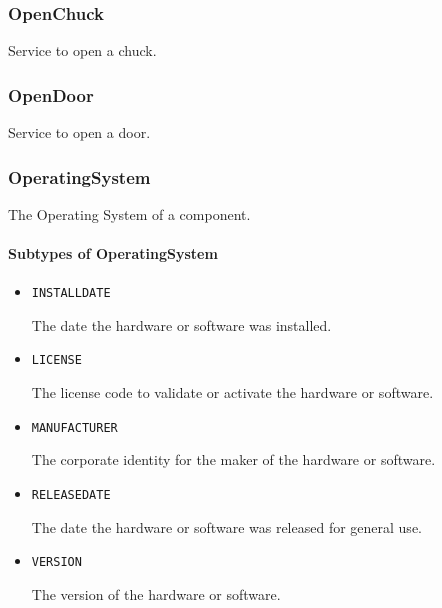 \subsubsection{OpenChuck}
\label{sec:OpenChuck}



Service to open a chuck.


\subsubsection{OpenDoor}
\label{sec:OpenDoor}



Service to open a door.


\subsubsection{OperatingSystem}
\label{sec:OperatingSystem}



The Operating System of a component.


\paragraph{Subtypes of OperatingSystem}\mbox{}
\label{sec:Subtypes of OperatingSystem}

\begin{itemize}

\item \texttt{INSTALL\textunderscore DATE}


The date the hardware or software was installed.

\item \texttt{LICENSE}


The license code to validate or activate the hardware or software.

\item \texttt{MANUFACTURER}


The corporate identity for the maker of the hardware or software.


\item \texttt{RELEASE\textunderscore DATE}


The date the hardware or software was released for general use.


\item \texttt{VERSION}


The version of the hardware or software.


\end{itemize}

